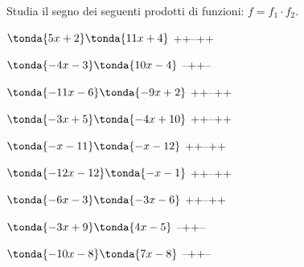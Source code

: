 \begin{esercizio}\label{ese:dis_6}
Studia il segno dei seguenti prodotti di funzioni: \(f = f_1 \cdot f_2\).
\begin{enumeratea}
\item  \(\tonda{5 x +2}\tonda{11 x +4}\) \sol 
{++--++}
\item  \(\tonda{-4 x -3}\tonda{10 x -4}\) \sol 
{--++--}
\item  \(\tonda{-11 x -6}\tonda{-9 x +2}\) \sol 
{++--++}
\item  \(\tonda{-3 x +5}\tonda{-4 x +10}\) \sol 
{++--++}
\item  \(\tonda{- x -11}\tonda{- x -12}\) \sol 
{++--++}
\item  \(\tonda{-12 x -12}\tonda{- x -1}\) \sol 
{++--++}
\item  \(\tonda{-6 x -3}\tonda{-3 x -6}\) \sol 
{++--++}
\item  \(\tonda{-3 x +9}\tonda{4 x -5}\) \sol 
{--++--}
\item  \(\tonda{-10 x -8}\tonda{7 x -8}\) \sol 
{--++--}
\end{enumeratea}
\end{esercizio}

\subsubsection*{}


